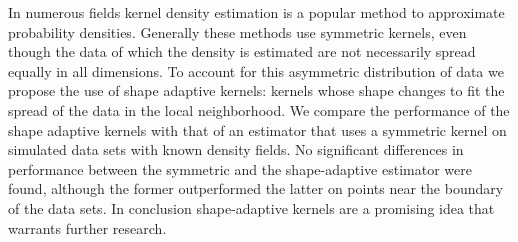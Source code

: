 \noindent In numerous fields kernel density estimation is a popular method to approximate probability densities.
Generally these methods use symmetric kernels, even though the data of which the density is estimated are not necessarily spread equally in all dimensions. To account for this asymmetric distribution of data we propose the use of shape adaptive kernels: kernels whose shape changes to fit the spread of the data in the local neighborhood.
We compare the performance of the shape adaptive kernels with that of an estimator that uses a symmetric kernel on simulated data sets with known density fields.
No significant differences in performance between the symmetric and the shape-adaptive estimator were found, although the former outperformed the latter on points near the boundary of the data sets. 
In conclusion shape-adaptive kernels are a promising idea that warrants further research.

